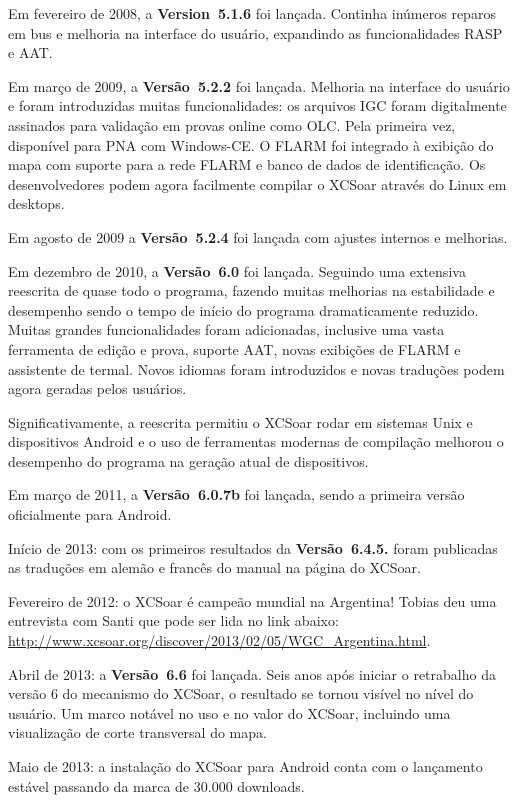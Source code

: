 Em fevereiro de 2008, a {\bf Version~5.1.6} foi lançada.  Continha inúmeros reparos em bus e melhoria na interface do usuário, expandindo as funcionalidades RASP e AAT. 

Em março de 2009, a {\bf Versão~5.2.2} foi lançada.  Melhoria na interface do usuário e foram introduzidas muitas funcionalidades: os arquivos IGC foram digitalmente assinados para validação em provas online como OLC.  Pela primeira vez, disponível para PNA com Windows-CE.  O FLARM foi integrado à exibição do mapa com suporte para a rede FLARM e banco de dados de identificação.  Os desenvolvedores podem agora facilmente compilar o XCSoar através do Linux em desktops. 

Em agosto de 2009 a {\bf Versão~5.2.4} foi lançada com ajustes internos e melhorias.

Em dezembro de 2010, a {\bf Versão~6.0} foi lançada.  Seguindo uma extensiva reescrita de quase todo o programa, fazendo muitas melhorias na estabilidade e desempenho sendo o tempo de início do programa dramaticamente reduzido.  Muitas grandes funcionalidades foram adicionadas, inclusive uma vasta ferramenta de edição e prova, suporte AAT, novas exibições de FLARM e assistente de termal.   Novos idiomas foram introduzidos e novas traduções podem agora geradas pelos usuários.

Significativamente, a reescrita permitiu o XCSoar rodar em sistemas Unix e dispositivos Android e o uso de ferramentas modernas de compilação melhorou o desempenho do programa na geração atual de dispositivos.

Em março de 2011, a {\bf Versão~6.0.7b} foi lançada, sendo a primeira versão oficialmente para Android.

Início de 2013: com os primeiros resultados da {\bf Versão~6.4.5.} foram publicadas as traduções em alemão e francês do manual na página do XCSoar.

Fevereiro de 2012: o XCSoar é campeão mundial na Argentina!  Tobias deu uma entrevista com Santi que pode ser lida no link abaixo:
\url{http://www.xcsoar.org/discover/2013/02/05/WGC_Argentina.html}.

Abril de 2013: a {\bf Versão~6.6} foi lançada.  Seis anos após iniciar o retrabalho da versão 6 do mecanismo do XCSoar, o resultado se tornou visível no nível do usuário.  Um marco notável no uso e no valor do XCSoar, incluindo uma visualização de corte transversal do mapa.

Maio de 2013: a instalação do XCSoar para Android conta com o lançamento estável passando da marca de 30.000 downloads.

